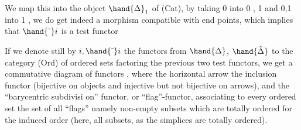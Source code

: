 
We map this into the object $\hand{\Delta}_1$ of (Cat), by taking \hand{\{}0\hand{\}} into 0 ,
\hand{\{}1\hand{\}} and \hand{\{}0,1\hand{\}} into 1 , we do get indeed a morphism compatible with end
points, which implies that $\hand{\tilde{\ }}i$ is a test functor 

If we denote still by $i,\hand{\tilde{\ }}i$ the functors from $\hand{\Delta}$, $\hand{\tilde{\Delta}}$ to the category
(Ord) of ordered sets factoring the previous two test functors, we get a
commutative diagram of functors
,
where the  horizontal arrow  the inclusion functor (bijective on objects\hand{,}
and injective but not bijective on arrows), and  the ``barycentric subdivisi%
on'' functor, or ``flag''-functor, associating to every ordered set the set
of all ``flags'' namely non-empty subsets which are totally ordered for the
induced order (here, all subsets, as the simplices are totally ordered).

